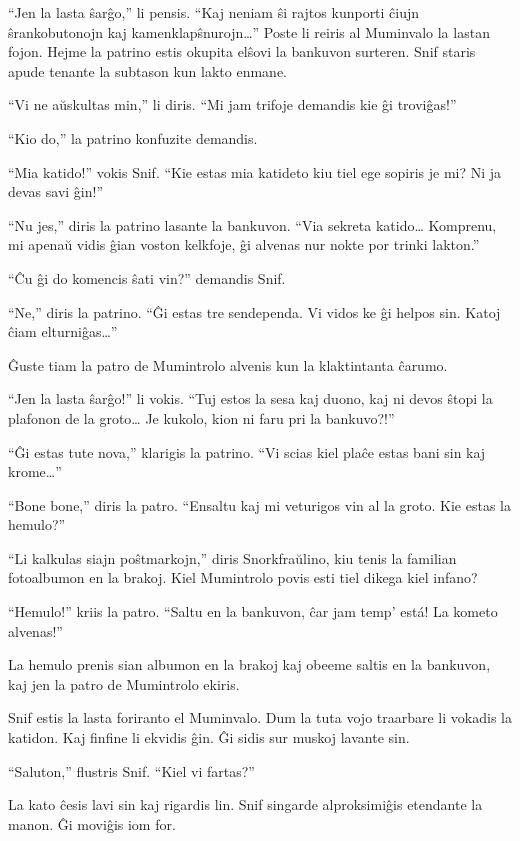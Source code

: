 ``Jen la lasta ŝarĝo,'' li pensis. ``Kaj neniam ŝi rajtos kunporti ĉiujn ŝrankobutonojn kaj kamenklapŝnurojn{\ldots}'' Poste li reiris al Muminvalo la lastan fojon.
\sectionbreak
Hejme la patrino estis okupita elŝovi la bankuvon surteren. Snif staris apude tenante la subtason kun lakto enmane.

``Vi ne aŭskultas min,'' li diris. ``Mi jam trifoje demandis kie ĝi troviĝas!''

``Kio do,'' la patrino konfuzite demandis.

``Mia katido!'' vokis Snif. ``Kie estas mia katideto kiu tiel ege sopiris je mi? Ni ja devas savi ĝin!''

``Nu jes,'' diris la patrino lasante la bankuvon. ``Via sekreta katido{\ldots} Komprenu, mi apenaŭ vidis ĝian voston kelkfoje, ĝi alvenas nur nokte por trinki lakton.''

``Ĉu ĝi do komencis ŝati vin?'' demandis Snif.

``Ne,'' diris la patrino. ``Ĝi estas tre sendependa. Vi vidos ke ĝi helpos sin. Katoj ĉiam elturniĝas{\ldots}''

Ĝuste tiam la patro de Mumintrolo alvenis kun la klaktintanta ĉarumo.

``Jen la lasta ŝarĝo!'' li vokis. ``Tuj estos la sesa kaj duono, kaj ni devos ŝtopi la plafonon de la groto{\ldots} Je kukolo, kion ni faru pri la bankuvo?!''

``Ĝi estas tute nova,'' klarigis la patrino. ``Vi scias kiel plaĉe estas bani sin kaj krome{\ldots}''

``Bone bone,'' diris la patro. ``Ensaltu kaj mi veturigos vin al la groto. Kie estas la hemulo?''

``Li kalkulas siajn poŝtmarkojn,'' diris Snorkfraŭlino, kiu tenis la familian fotoalbumon en la brakoj. Kiel Mumintrolo povis esti tiel dikega kiel infano?

``Hemulo!'' kriis la patro. ``Saltu en la bankuvon, ĉar jam temp' está! La kometo alvenas!''

La hemulo prenis sian albumon en la brakoj kaj obeeme saltis en la bankuvon, kaj jen la patro de Mumintrolo ekiris.

Snif estis la lasta foriranto el Muminvalo. Dum la tuta vojo traarbare li vokadis la katidon. Kaj finfine li ekvidis ĝin. Ĝi sidis sur muskoj lavante sin.

``Saluton,'' flustris Snif. ``Kiel vi fartas?''

La kato ĉesis lavi sin kaj rigardis lin. Snif singarde alproksimiĝis etendante la manon. Ĝi moviĝis iom for.


